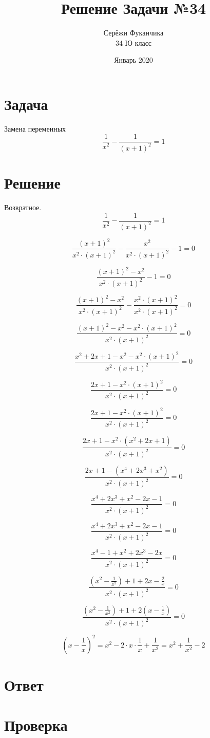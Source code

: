 \documentclass{article}
\title{Решение Задачи №34}
\author{Серёжи Фуканчика\\34 Ю класс}
\date{Январь 2020}
\begin{document}
\maketitle

\section{Задача}
Замена переменных
$$
\frac{1}{x^2}-\frac{1}{(x+1)^2}=1
$$

\section{Решение}
Возвратное.
$$
\frac{1}{x^2}-\frac{1}{(x+1)^2}=1
$$

$$
\frac{(x+1)^2}{x^2\cdot{}(x+1)^2}-\frac{x^2}{x^2\cdot{}(x+1)^2}-1=0
$$

$$
\frac{(x+1)^2-x^2}{x^2\cdot{}(x+1)^2}-1=0
$$

$$
\frac{(x+1)^2-x^2}{x^2\cdot{}(x+1)^2}-\frac{x^2\cdot{}(x+1)^2}{x^2\cdot{}(x+1)^2}=0
$$

$$
\frac{(x+1)^2-x^2-x^2\cdot{}(x+1)^2}{x^2\cdot{}(x+1)^2}=0
$$

$$
\frac{x^2+2x+1-x^2-x^2\cdot{}(x+1)^2}{x^2\cdot{}(x+1)^2}=0
$$

$$
\frac{2x+1-x^2\cdot{}(x+1)^2}{x^2\cdot{}(x+1)^2}=0
$$

$$
\frac{2x+1-x^2\cdot{}(x+1)^2}{x^2\cdot{}(x+1)^2}=0
$$

$$
\frac{2x+1-x^2\cdot{}(x^2+2x+1)}{x^2\cdot{}(x+1)^2}=0
$$

$$
\frac{2x+1-(x^4+2x^3+x^2)}{x^2\cdot{}(x+1)^2}=0
$$

$$
\frac{x^4+2x^3+x^2-2x-1}{x^2\cdot{}(x+1)^2}=0
$$

$$
\frac{x^4+2x^3+x^2-2x-1}{x^2\cdot{}(x+1)^2}=0
$$

$$
\frac{x^4-1+x^2+2x^3-2x}{x^2\cdot{}(x+1)^2}=0
$$

$$
\frac{\left(x^2-\frac{1}{x^2}\right)+1+2x-\frac{2}{x}}{x^2\cdot{}(x+1)^2}=0
$$

$$
\frac{\left(x^2-\frac{1}{x^2}\right)+1+2\left(x-\frac{1}{x}\right)}{x^2\cdot{}(x+1)^2}=0
$$

$$(x-\frac{1}{x})^2=x^2-2\cdot{}x\cdot{}\frac{1}{x}+\frac{1}{x^2}=x^2+\frac{1}{x^2}-2$$
\section{Ответ}

\section{Проверка}
\end{document}
